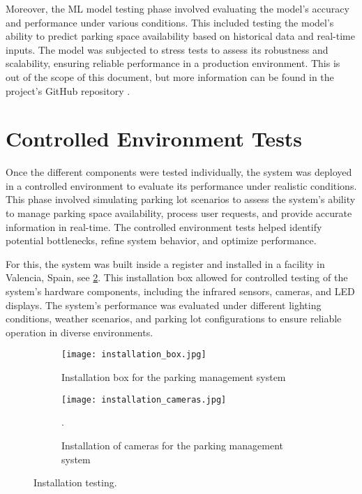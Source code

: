 Moreover, the ML model testing phase involved evaluating the model's accuracy and performance under various conditions. This included testing the model's ability to predict parking space availability based on historical data and real-time inputs. The model was subjected to stress tests to assess its robustness and scalability, ensuring reliable performance in a production environment. This is out of the scope of this document, but more information can be found in the project's GitHub repository \autocite{RAMAJOBALLESTER2024104608}.

\section{Controlled Environment Tests}

Once the different components were tested individually, the system was deployed in a controlled environment to evaluate its performance under realistic conditions. This phase involved simulating parking lot scenarios to assess the system's ability to manage parking space availability, process user requests, and provide accurate information in real-time. The controlled environment tests helped identify potential bottlenecks, refine system behavior, and optimize performance.

For this, the system was built inside a register and installed in a facility in Valencia, Spain, see \cref{fig:installation_testing}. This installation box allowed for controlled testing of the system's hardware components, including the infrared sensors, cameras, and LED displays. The system's performance was evaluated under different lighting conditions, weather scenarios, and parking lot configurations to ensure reliable operation in diverse environments.

\begin{figure}
	\hfill
	\begin{subfigure}{0.45\textwidth}
		\texttt{[image: installation\_box.jpg]}
		\caption{Installation box for the parking management system}
	\end{subfigure}
	\hfill
	\begin{subfigure}{0.45\textwidth}
		\texttt{[image: installation\_cameras.jpg]}\label{fig:installation_cameras}
		\caption{Installation of cameras for the parking management system}.
	\end{subfigure}
	\hfill

	\caption{Installation testing.}\label{fig:installation_testing}
\end{figure}

